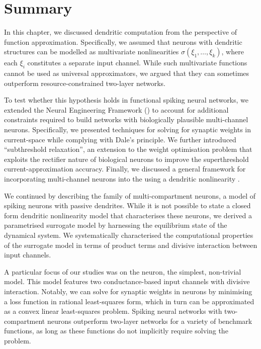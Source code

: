 
\section{Summary}
\label{sec:nlif_discussion}

In this chapter, we discussed dendritic computation from the perspective of function approximation.
Specifically, we assumed that neurons with dendritic structures can be modelled as multivariate nonlinearities $\sigma(\xi_1, \ldots, \xi_k)$, where each $\xi_i$ constitutes a separate input channel.
While such multivariate functions cannot be used as universal approximators, we argued that they can sometimes outperform resource-constrained two-layer networks.

To test whether this hypothesis holds in functional spiking neural networks, we extended the Neural Engineering Framework (\NEF) to account for additional constraints required to build networks with biologically plausible multi-channel neurons.
Specifically, we presented techniques for solving for synaptic weights in current-space while complying with Dale's principle.
We further introduced \enquote{subthreshold relaxation}, an extension to the weight optimisation problem that exploits the rectifier nature of biological neurons to improve the superthreshold current-approximation accuracy.
Finally, we discussed a general framework for incorporating multi-channel neurons into the \NEF using a dendritic nonlinearity \Hden.

We continued by describing the \nlif family of multi-compartment neurons, a model of spiking neurons with passive dendrites.
While it is not possible to state a closed form dendritic nonlinearity model \Hden that characterises these neurons, we derived a parametrised surrogate model by harnessing the equilibrium state of the \nlif dynamical system.
We systematically characterised the computational properties of the surrogate model in terms of product terms and divisive interaction between input channels.

A particular focus of our studies was on the \twocomplif neuron, the simplest, non-trivial \nlif model.
This model features two conductance-based input channels with divisive interaction.
Notably, we can solve for synaptic weights in \twocomplif neurons by minimising a loss function in rational least-squares form, which in turn can be approximated as a convex linear least-squares problem.
Spiking neural networks with two-compartment neurons outperform two-layer networks for a variety of benchmark functions, as long as these functions do not implicitly require solving the \XOR problem.

